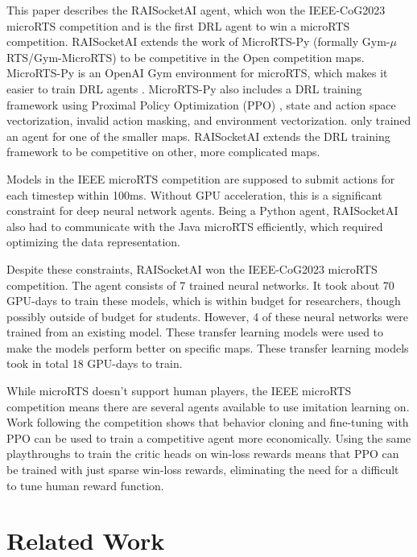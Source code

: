 \documentclass{article}
\begin{document}
This paper describes the RAISocketAI agent, which won the IEEE-CoG2023 microRTS
competition and is the first DRL agent to win a microRTS competition. RAISocketAI
extends the work of MicroRTS-Py (formally Gym-$\mu$RTS/Gym-MicroRTS) to be competitive
in the Open competition maps. MicroRTS-Py is an OpenAI Gym environment for microRTS,
which makes it easier to train DRL agents \citep{DBLP:journals/corr/abs-2105-13807}.
MicroRTS-Py also includes a DRL training framework using Proximal Policy Optimization
(PPO) \citep{DBLP:journals/corr/SchulmanWDRK17}, state and action space vectorization,
invalid action masking, and environment vectorization.
\citet{DBLP:journals/corr/abs-2105-13807} only trained an agent for one of the smaller
maps. RAISocketAI extends the DRL training framework to be competitive on other, more
complicated maps.

Models in the IEEE microRTS competition are supposed to submit actions for each timestep
within 100ms. Without GPU acceleration, this is a significant constraint for deep neural
network agents. Being a Python agent, RAISocketAI also had to communicate with the Java
microRTS efficiently, which required optimizing the data representation.

Despite these constraints, RAISocketAI won the IEEE-CoG2023 microRTS competition. The
agent consists of 7 trained neural networks. It took about 70 GPU-days to train these
models, which is within budget for researchers, though possibly outside of budget for
students. However, 4 of these neural networks were trained from an existing model. These
transfer learning models were used to make the models perform better on specific maps.
These transfer learning models took in total 18 GPU-days to train.

While microRTS doesn't support human players, the IEEE microRTS competition means there
are several agents available to use imitation learning on. Work following the
competition shows that behavior cloning and fine-tuning with PPO can be used to train a
competitive agent more economically. Using the same playthroughs to train the critic
heads on win-loss rewards means that PPO can be trained with just sparse win-loss
rewards, eliminating the need for a difficult to tune human reward function.

\section{Related Work}
\end{document}
